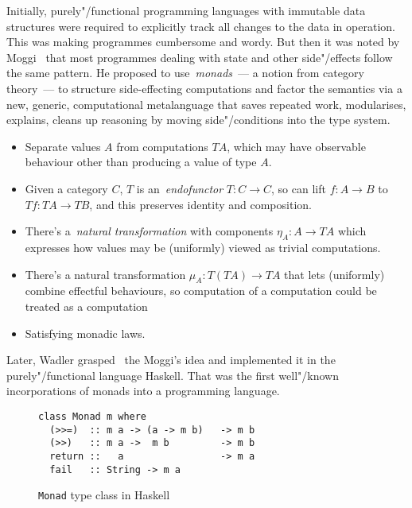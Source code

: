 
Initially, purely"/functional programming languages with immutable data structures
were required to explicitly track all changes to the data in operation.
This was making programmes cumbersome and wordy. But then it was noted by
Moggi~\cite{Moggi:1991:NCM:116981.116984} that most programmes dealing with
state and other side"/effects follow the same pattern. He proposed to
use~\emph{monads}~--- a notion from category theory~--- to structure side-effecting
computations and factor the semantics via a new, generic, computational metalanguage that
saves repeated work, modularises, explains, cleans up reasoning by moving side"/conditions
into the type system.

\begin{itemize}
  \item Separate values $A$ from computations $T A$, which may have observable
  behaviour other than producing a value of type $A$.
  \item Given a category $C$, $T$ is an~\emph{endofunctor} $T:C \rightarrow C$, so can
  lift $f:A \rightarrow B$ to $T f:T A \rightarrow T B$, and this preserves
  identity and composition.
  \item There’s a~\emph{natural transformation} with components
   $\eta_A : A \rightarrow T A$ which expresses how values may be
  (uniformly) viewed as trivial computations.
  \item There’s a natural transformation $\mu_A : T (T A) \rightarrow T A$ that lets
  (uniformly) combine effectful behaviours, so computation of
  a computation could be treated as a computation
  \item Satisfying monadic laws.
\end{itemize}

Later, Wadler grasped~\cite{Wadler:1992:EFP:143165.143169} the Moggi's idea and
implemented it in the purely"/functional language Haskell. That was the first
well"/known incorporations of monads into a programming language.

    \begin{figure}[h]
    \begin{lstlisting}
class Monad m where
  (>>=)  :: m a -> (a -> m b)   -> m b
  (>>)   :: m a ->  m b         -> m b
  return ::   a                 -> m a
  fail   :: String -> m a
    \end{lstlisting}
    \caption{\texttt{Monad} type class in Haskell}
    \label{listing:monadClass}
    \end{figure}


